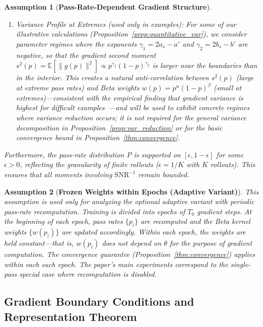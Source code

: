 \documentclass{article}
\newtheorem{assumption}{Assumption}
\begin{document}
\begin{assumption}[\textbf{Pass-Rate-Dependent Gradient Structure}]
\begin{enumerate}
 \item[(c)] \emph{Variance Profile at Extremes (used only in examples):} For some of our illustrative calculations (Proposition~\ref{prop:quantitative_var}), we consider parameter regimes where the exponents $\gamma_1 = 2a_s - a'$ and $\gamma_2 = 2b_s - b'$ are negative, so that the gradient second moment $s^2(p) = \mathbb{E}[\|g(p)\|^2] \propto p^{\gamma_1}(1-p)^{\gamma_2}$ is larger near the boundaries than in the interior. This creates a natural anti-correlation between $s^2(p)$ (large at extreme pass rates) and Beta weights $w(p)=p^\alpha(1-p)^\beta$ (small at extremes)---consistent with the empirical finding that gradient variance is highest for difficult examples~\citep{agarwal2022vog}---and will be used to exhibit concrete regimes where variance reduction occurs; it is \emph{not} required for the general variance decomposition in Proposition~\ref{prop:var_reduction} or for the basic convergence bound in Proposition~\ref{thm:convergence}.
\end{enumerate}
Furthermore, the pass-rate distribution $P$ is supported on $[\epsilon, 1-\epsilon]$ for some $\epsilon > 0$, reflecting the granularity of finite rollouts ($\epsilon = 1/K$ with $K$ rollouts). This ensures that all moments involving $\text{SNR}^{-1}$ remain bounded.
\end{assumption}

\begin{assumption}[\textbf{Frozen Weights within Epochs (Adaptive Variant)}]
\label{asm:frozen_weights}
This assumption is used only for analyzing the optional adaptive variant with periodic pass-rate recomputation. Training is divided into epochs of $T_0$ gradient steps. At the beginning of each epoch, pass rates $\{p_i\}$ are recomputed and the Beta kernel weights $\{w(p_i)\}$ are updated accordingly. Within each epoch, the weights are held constant---that is, $w(p_i)$ does not depend on $\theta$ for the purpose of gradient computation. The convergence guarantee (Proposition~\ref{thm:convergence}) applies within each such epoch. The paper's main experiments correspond to the single-pass special case where recomputation is disabled.
\end{assumption}

\subsection{Gradient Boundary Conditions and Representation Theorem}
\label{app:boundary_representation}
\end{document}
